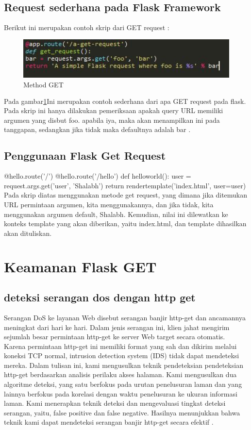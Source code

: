 \subsection{Request sederhana pada Flask Framework}
Berikut ini merupakan contoh skrip dari GET request :
\begin{figure}[ht]
\centerline{\includegraphics[width=1\textwidth]{figures/3FlaskGet.jpg}}
\caption{Method GET}
\label{labelgambar}
\end{figure}
Pada gambar\ref{labelgambar}Ini merupakan contoh sederhana dari apa GET request pada flask. Pada skrip ini hanya dilakukan pemeriksaan apakah query URL memiliki argumen yang disbut foo. apabila iya, maka akan menampilkan ini pada tanggapan, sedangkan jika tidak maka defaultnya adalah bar \cite{aggarwal2014flask}.
\subsection{Penggunaan Flask Get Request}
@hello.route('/')
@hello.route('/hello')
def helloworld():
user = request.args.get('user', 'Shalabh')
return rendertemplate('index.html', user=user)
Pada skrip diatas menggunakan metode get request, yang dimana jika ditemukan URL permintaan argumen, kita menggunakannya, dan jika tidak, kita menggunakan argumen default, Shalabh. Kemudian, nilai ini dilewatkan ke konteks template yang akan diberikan, yaitu index.html, dan template dihasilkan akan dituliskan\cite{aggarwal2014flask}.

\section{Keamanan Flask GET}
\subsection{deteksi serangan dos dengan http get}
Serangan DoS ke layanan Web disebut serangan banjir http-get dan ancamannya meningkat dari hari ke hari. Dalam jenis serangan ini, klien jahat mengirim sejumlah besar permintaan http-get ke server Web target secara otomatis. Karena permintaan http-get ini memiliki format yang sah dan dikirim melalui koneksi TCP normal, intrusion detection system (IDS) tidak dapat mendeteksi mereka. Dalam tulisan ini, kami mengusulkan teknik pendeteksian pendeteksian http-get berdasarkan analisis perilaku akses halaman. Kami mengusulkan dua algoritme deteksi, yang satu berfokus pada urutan penelusuran laman dan yang lainnya berfokus pada korelasi dengan waktu penelusuran ke ukuran informasi laman. Kami menerapkan teknik deteksi dan mengevaluasi tingkat deteksi serangan, yaitu, false positive dan false negative. Hasilnya menunjukkan bahwa teknik kami dapat mendeteksi serangan banjir http-get secara efektif \cite{yatagai2007detection}.
